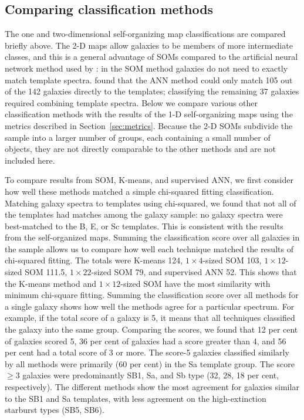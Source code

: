 \subsection{Comparing classification methods}
    \label{sec: Kmeansvssomvsann}
   
    The one and two-dimensional self-organizing map classifications are compared briefly above. 
    The 2-D maps allow galaxies to be members of more intermediate classes, and this is a general advantage of SOMs compared to the artificial neural network method used by : in the SOM method galaxies do not need to exactly match template spectra. 
     found that the ANN method could only match 105 out of the 142 galaxies directly to the  templates; classifying the remaining 37 galaxies required combining template spectra.
    Below we compare various other classification methods with the results of the 1-D self-organizing maps using the metrics described in Section~\ref{sec:metrics}.
    Because the 2-D SOMs subdivide the sample into a larger number of groups, each containing a small number of objects, they are not directly comparable to the other methods and are not included here.
       
       To compare results from SOM, K-means, and supervised ANN, we first consider how well these methods matched a simple chi-squared fitting classification. 
        Matching galaxy spectra to templates using chi-squared, we found that not all of the templates had matches among the galaxy sample: no galaxy spectra were best-matched to the B, E, or Sc templates. 
        This is consistent with the results from the self-organized maps.
        Summing the classification score over all galaxies in the sample allows us to compare how well each technique matched the results of chi-squared fitting.
        The totals were K-means 124, $1\times4$-sized SOM 103, $1\times12$-sized SOM 111.5, $1\times22$-sized SOM 79, and supervised ANN 52.
        This shows that the K-means method and $1\times12$-sized SOM have the most similarity with minimum chi-square fitting.
        Summing the classification score over all methods for a single galaxy shows how well the methods agree for a particular spectrum.
        For example, if the total score of a galaxy is 5, it means that all techniques classified the galaxy into the same group.
        Comparing the scores, we found that 12 per cent of galaxies scored 5, 36 per cent of galaxies had a score greater than 4, and 56 per cent had a total score of 3 or more.
        The score-5 galaxies classified similarly by all methods were primarily (60 per cent) in the Sa template group. 
        The score $\geq 3$ galaxies were predominantly SB1, Sa, and Sb type (32, 28, 18 per cent, respectively).
        The different methods show the most agreement for galaxies similar to the SB1 and Sa templates, with less agreement on the high-extinction starburst types (SB5, SB6).
           
